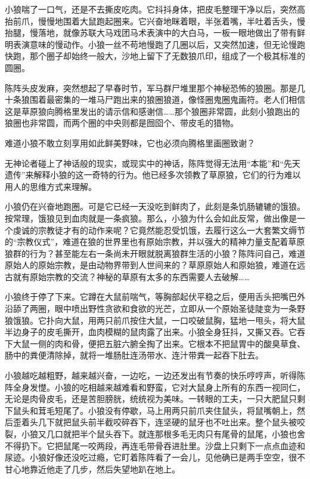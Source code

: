 \par 小狼喘了一口气，还是不去撕皮吃肉。它抖抖身体，把皮毛整理干净以后，突然高抬前爪，慢慢地围着大鼠跑起圈来。它兴奋地眯着眼，半张着嘴，半吐着舌头，慢抬腿，慢落地，就像苏联大马戏团马术表演中的大白马，一板一眼地做出了带有鲜明表演意味的慢动作。小狼一丝不苟地慢跑了几圈以后，又突然加速，但无论慢跑快跑，那个圈子却始终一般大，沙地上留下了无数狼爪印，组成了一个极其标准的圆圈。
\par 陈阵头皮发麻，突然想起了早春时节，军马群尸堆里那个神秘恐怖的狼圈。那是几十条狼围着最密集的一堆马尸跑出来的狼圈狼道，像怪圈鬼圈鬼画符。老人们相信这是草原狼向腾格里发出的请示信和感谢信……那个狼圈非常圆，此刻小狼跑出的狼圈也非常圆，而两个圈的中央则都是囫囵个、带皮毛的猎物。
\par 难道小狼不敢立刻享用如此鲜美野味，它也必须向腾格里画圈致谢？
\par 无神论者碰上了神话般的现实，或现实中的神话，陈阵觉得无法用“本能”和“先天遗传”来解释小狼的这一奇特的行为。他已经多次领教了草原狼，它们的行为难以用人的思维方式来理解。
\par 小狼仍在兴奋地跑圈。可是它已经一天没吃到鲜肉了，此刻是条饥肠辘辘的饿狼。按常理，饿狼见到血肉就是一条疯狼。那么，小狼为什么会如此反常，做出像是一个虔诚的宗教徒才有的动作来呢？它竟然能忍受饥饿，去履行这么一大套繁文缛节的“宗教仪式”，难道在狼的世界里也有原始宗教，并以强大的精神力量支配着草原狼群的行为？甚至能左右一条尚未开眼就脱离狼群生活的小狼？陈阵问自己，难道原始人的原始宗教，是由动物界带到人世间来的？草原原始人和原始狼，难道在远古就有原始宗教的交流？神秘的草原有太多的东西需要人去破解……
\par 小狼终于停了下来。它蹲在大鼠前喘气，等胸部起伏平稳之后，便用舌头把嘴巴外沿舔了两圈，眼中喷出野性贪欲和食欲的光芒，立即从一个原始圣徒陡变为一条野狼饿狼。它扑向大鼠，用两只前爪按住大鼠，一口咬破鼠胸，猛地一甩头，将大鼠半边身子的皮毛撕开，血肉模糊的鼠肉露了出来。小狼全身狂抖，又撕又吞。它吞下大鼠一侧的肉和骨，便把五脏六腑全掏了出来。它根本不把鼠胃中的酸臭草食、肠中的粪便清除掉，就将一堆肠肚连汤带水、连汁带粪一起吞下肚去。
\par 小狼越吃越粗野，越来越兴奋，一边吃，一边还发出有节奏的快乐哼哼声，听得陈阵全身发憷。小狼的吃相越来越难看和野蛮，它对大鼠身上所有的东西一视同仁，无论是肉骨皮毛，还是苦胆膀胱，统统视为美味。一转眼的工夫，一只大肥鼠只剩下鼠头和茸毛短尾了。小狼没有停歇，马上用两只前爪夹住鼠头，将鼠嘴朝上，然后歪着头几下就把鼠头前半截咬碎吞下，连坚硬的鼠牙也不吐出来。整个鼠头被咬裂，小狼又几口就把半个鼠头吞下。就连那根多毛无肉只有尾骨的鼠尾，小狼也舍不得扔下。它把鼠尾一咬两段，再连毛带骨吞进肚里。沙盘上只剩下一点点血迹和尿迹。小狼好像还没吃过瘾，它盯着陈阵看了一会儿，见他确已是两手空空，很不甘心地靠近他走了几步，然后失望地趴在地上。
